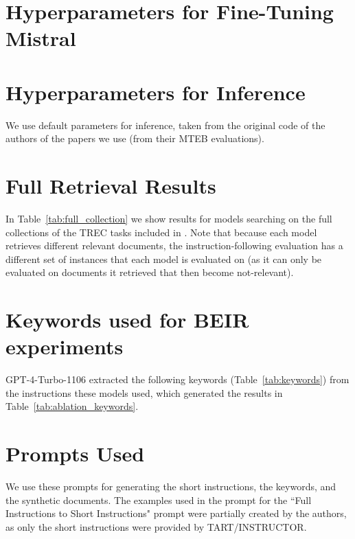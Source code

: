 \documentclass{article} %
\begin{document}



\appendix
\section{Hyperparameters for Fine-Tuning Mistral}
\label{app:hyperparameters}


\section{Hyperparameters for Inference}
\label{app:hyperparameters_inferece}
We use default parameters for inference, taken from the original code of the authors of the papers we use (from their MTEB evaluations).

\section{Full Retrieval Results}
\label{app:full_retrieval}
In Table~\ref{tab:full_collection} we show results for models searching on the full collections of the TREC tasks included in \dataset. Note that because each model retrieves different relevant documents, the instruction-following evaluation has a different set of instances that each model is evaluated on (as it can only be evaluated on documents it retrieved that then become not-relevant).



\section{Keywords used for BEIR experiments}
\label{app:extracted_beir}
GPT-4-Turbo-1106 extracted the following keywords (Table~\ref{tab:keywords}) from the instructions these models used, which generated the results in Table~\ref{tab:ablation_keywords}. 



\section{Prompts Used}
\label{app:prompts}
We use these prompts for generating the short instructions, the keywords, and the synthetic documents. The examples used in the prompt for the ``Full Instructions to Short Instructions" prompt were partially created by the authors, as only the short instructions were provided by TART/INSTRUCTOR.
\end{document}
